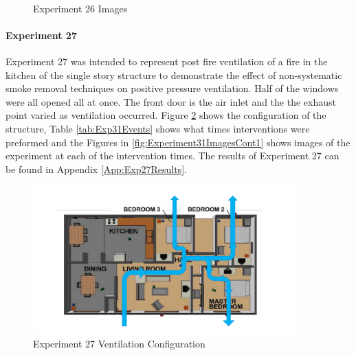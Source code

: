 \documentclass{article}
\begin{document}
\begin{figure}[H]
	\ContinuedFloat 
	\centering 
	 \ 
	\caption{Experiment 26 Images}
	\label{fig:Experiment30ImagesCont4} 
\end{figure}

\paragraph{Experiment 27} \mbox{}

Experiment 27 was intended to represent post fire ventilation of a fire in the kitchen of the single story structure to demonstrate the effect of non-systematic smoke removal techniques on positive pressure ventilation. Half of the windows were all opened all at once. The front door is the air inlet and the the exhaust point varied as ventilation occurred. Figure \ref{fig:Exp31VentConfig} shows the configuration of the structure, Table \ref{tab:Exp31Events} shows what times interventions were preformed and the Figures in \ref{fig:Experiment31ImagesCont1} shows images of the experiment at each of the intervention times. The results of Experiment 27 can be found in Appendix \ref{App:Exp27Results}.

\begin{figure} [H]
	\centering
	\includegraphics[width = 4in]{0_Images/Tactical_Considerations/Systematic_Vs_Non-Systematic/Non_Systematic.pdf}
	\caption{Experiment 27 Ventilation Configuration}
	\label{fig:Exp31VentConfig}
\end{figure}
\end{document}
